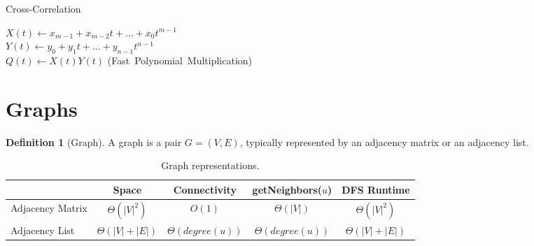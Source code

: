 \documentclass[11pt]{article}
\theoremstyle{definition}
\newtheorem{definition}{Definition}[section]
\theoremstyle{remark}
\begin{document}
\begin{algorithm}
    \caption{Cross-Correlation}
 
    \DontPrintSemicolon
    
    $X(t) \gets x_{m-1} + x_{m-2}t + \dots + x_0 t^{m-1}$ \\
    $Y(t) \gets y_0 + y_1 t + \dots + y_{n-1} t^{n-1}$ \\
    $Q(t) \gets X(t)Y(t)$ \quad \mbox{(Fast Polynomial Multiplication)}\\
\end{algorithm}
\clearpage

\section{Graphs}
\begin{definition}[Graph] A graph is a pair $G=(V,E)$, typically represented by an adjacency matrix or an adjacency list.
\end{definition}

\begin{table}[ht]
\centering
\caption{Graph representations.}
\begin{tabular}[t]{lcccc}
\hline
& Space & Connectivity & getNeighbors($u$) & DFS Runtime\\
\hline
Adjacency Matrix & $\Theta(|V|^2)$ & $O(1)$ & $\Theta(|V|)$ & $\Theta(|V|^2)$\\
Adjacency List & $\Theta(|V|+|E|)$ & $\Theta(degree(u))$ & $\Theta(degree(u))$ & $\Theta(|V|+|E|)$ \\
\hline
\end{tabular}
\end{table}
\end{document}

